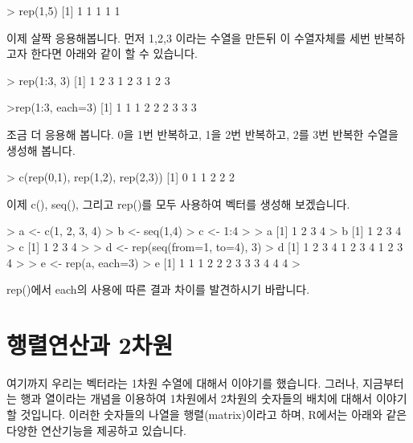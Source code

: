 \documentclass[tutorial.tex]{subfiles}
\begin{document}
\begin{Schunk}
\begin{Soutput}
> rep(1,5)
[1] 1 1 1 1 1
\end{Soutput}
\end{Schunk}

이제 살짝 응용해봅니다.  
먼저 1,2,3 이라는 수열을 만든뒤 이 수열자체를 세번 반복하고자 한다면 아래와 같이 할 수 있습니다. 

\begin{Schunk}
\begin{Soutput}
> rep(1:3, 3)
[1] 1 2 3 1 2 3 1 2 3	
\end{Soutput}
\end{Schunk}
>rep(1:3, each=3)
[1] 1 1 1 2 2 2 3 3 3

조금 더 응용해 봅니다. 
0을 1번 반복하고, 1을 2번 반복하고, 2를 3번 반복한 수열을 생성해 봅니다. 

\begin{Schunk}
\begin{Soutput}
> c(rep(0,1), rep(1,2), rep(2,3))
[1] 0 1 1 2 2 2
\end{Soutput}
\end{Schunk}

이제 c(), seq(), 그리고 rep()를 모두 사용하여 벡터를 생성해 보겠습니다.

\begin{Schunk}
\begin{Soutput}
> a <- c(1, 2, 3, 4)
> b <- seq(1,4)
> c <- 1:4
>
> a
[1] 1 2 3 4
> b
[1] 1 2 3 4
> c
[1] 1 2 3 4
>
> d <- rep(seq(from=1, to=4), 3)
> d
[1] 1 2 3 4 1 2 3 4 1 2 3 4
>
> e <- rep(a, each=3)
> e
[1] 1 1 1 2 2 2 3 3 3 4 4 4
>
\end{Soutput}
\end{Schunk}

rep()에서 each의 사용에 따른 결과 차이를 발견하시기 바랍니다.


%
%
%

\section{행렬연산과 2차원}

여기까지 우리는 벡터라는 1차원 수열에 대해서 이야기를 했습니다. 
그러나, 지금부터는 행과 열이라는 개념을 이용하여 1차원에서 2차원의 숫자들의 배치에 대해서 이야기 할 것입니다. 
이러한 숫자들의 나열을 행렬(matrix)이라고 하며, R에서는 아래와 같은 다양한 연산기능을 제공하고 있습니다. 
\end{document}
